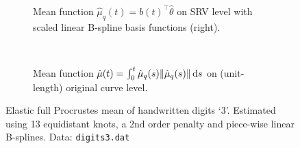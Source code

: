\begin{figure}[t]
  \centering
  \begin{subfigure}{\textwidth}
    \begin{subfigure}{.48\textwidth}
      \centering
    \end{subfigure}\hfill%
    \begin{subfigure}{.48\textwidth}
      \centering
      \begin{subfigure}{\textwidth}
        \centering
      \end{subfigure}
      \begin{subfigure}{\textwidth}
        \centering
      \end{subfigure}
    \end{subfigure}
    \caption{Mean function $\hat\mu_q(t) = b(t)^\top \hat\theta$ on SRV level with scaled linear B-spline basis functions (right).}
  \end{subfigure}\vspace{0.66em}\\
  \begin{subfigure}{\textwidth}
    \centering
    \begin{subfigure}{.48\textwidth}
      \centering
    \end{subfigure}\hfill%
    \begin{subfigure}{.48\textwidth}
      \centering
      \begin{subfigure}{\textwidth}
        \centering
      \end{subfigure}
      \begin{subfigure}{\textwidth}
        \centering
      \end{subfigure}
    \end{subfigure}
    \caption{Mean function $\hat\mu(t) = \int_0^t \hat\mu_q(s) \lVert\hat\mu_q(s)\rVert \mathop{\mathrm{d}s}$ on (unit-length) original curve level.}
  \end{subfigure}
  \caption{Elastic full Procrustes mean of handwritten digits \enquote*{3}.
    Estimated using 13 equidistant knots, a 2nd order penalty and piece-wise linear B-splines.
    Data: \texttt{digits3.dat}}
  \label{fig:3-mean}
\end{figure}


